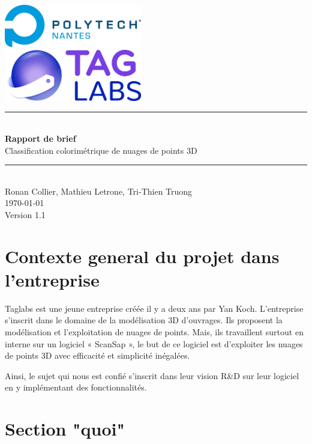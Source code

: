 \documentclass[12pt,titlepage,french]{article}
\begin{document}

\begin{titlepage}
\newcommand{\HRule}{\rule{\linewidth}{0.5mm}}
\center

  \includegraphics[width=0.45\textwidth]{./image2.png}\\[1cm]
   
  \includegraphics[width=0.45\textwidth]{./image1.png}


\HRule \\[0.4cm]
{ \huge \bfseries Rapport de brief \\[0.15cm] }
Classification colorimétrique de nuages de points 3D
\HRule \\[1.5cm]
Ronan Collier,
Mathieu Letrone,
Tri-Thien Truong
\\[1cm]
\today \\ [1cm]
Version 1.1
\end{titlepage}

\section{Contexte general du projet dans l'entreprise}

Taglabs est une jeune entreprise créée il y a deux ans par Yan Koch. L'entreprise s'inscrit dans le domaine de la modélisation 3D d'ouvrages. Ils proposent la modélisation et l'exploitation de nuages de points. Mais, ils travaillent surtout en interne sur un logiciel « ScanSap », le but de ce logiciel est d'exploiter les nuages de points 3D avec efficacité et simplicité inégalées.

Ainsi, le sujet qui nous est confié s'inscrit dans leur vision R\&D sur leur logiciel en y implémentant des fonctionnalités.


\section{Section "quoi"}
\end{document}
